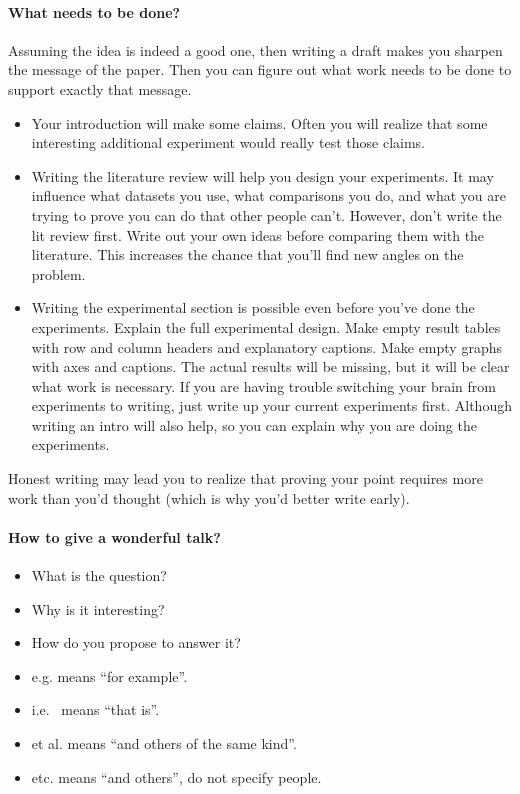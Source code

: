 \paragraph{What needs to be done?}
Assuming the idea is indeed a good one, then writing a draft makes you sharpen the message of the paper.
Then you can figure out what work needs to be done to support exactly that message.

\begin{itemize}
	\item Your introduction will make some claims. Often you will realize that some interesting additional experiment would really test those claims.
	\item Writing the literature review will help you design your experiments. It may influence what datasets you use, what comparisons you do, and what you are trying to prove you can do that other people can't.
	      However, don't write the lit review first. Write out your own ideas before comparing them with the literature. This increases the chance that you'll find new angles on the problem.
	\item Writing the experimental section is possible even before you've done the experiments. Explain the full experimental design. Make empty result tables with row and column headers and explanatory captions. Make empty graphs with axes and captions. The actual results will be missing, but it will be clear what work is necessary.
	      If you are having trouble switching your brain from experiments to writing, just write up your current experiments first. Although writing an intro will also help, so you can explain why you are doing the experiments.
\end{itemize}

Honest writing may lead you to realize that proving your point requires more work than you'd thought (which is why you'd better write early).


\paragraph{How to give a wonderful talk?}
\begin{itemize}
	\item What is the question?
	\item Why is it interesting?
	\item How do you propose to answer it?
\end{itemize}


\begin{itemize}
	\item e.g. means \enquote{for example}.
	\item i.e.  \ means \enquote{that is}.
	\item et al. means \enquote{and others of the same kind}.
	\item etc. means \enquote{and others}, do not specify people.
\end{itemize}

